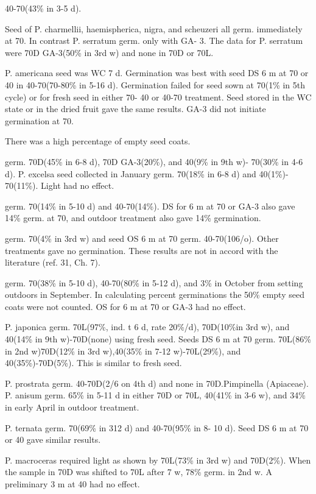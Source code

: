 \begin{description}
40-70(43\% in 3-5 d).
\item[Phyteuma (Campanulaceae)] Seed of P. charmellii, haemispherica, nigra,
and scheuzeri all germ. immediately at 70. In contrast P. serratum germ. only with GA-
3. The data for P. serratum were 70D GA-3(50\% in 3rd w) and none in 70D or 70L.
\item[Phytolacca (Phytolaccaceae)] P. americana seed was WC 7 d.
Germination was best with seed DS 6 m at 70 or 40 in 40-70(70-80\% in 5-16 d).
Germination failed for seed sown at 70(1\% in 5th cycle) or for fresh seed in either 70-
40 or 40-70 treatment. Seed stored in the WC state or in the dried fruit gave the same
results. GA-3 did not initiate germination at 70.

\item[Picea (Pinaceae)] There was a high percentage of empty seed coats.
\item[P. abies] germ. 70D(45\% in 6-8 d), 70D GA-3(20\%), and 40(9\% in 9th w)-
70(30\% in 4-6 d).
P. excelsa seed collected in January germ. 70(18\% in 6-8 d) and 40(1\%)-
70(11\%). Light had no effect.
\item[P. mariana] germ. 70(14\% in 5-10 d) and 40-70(14\%). DS for 6 m at 70 or GA-3
also gave 14\% germ. at 70, and outdoor treatment also gave 14\% germination.
\item[P. pungens] germ. 70(4\% in 3rd w) and seed OS 6 m at 70 germ. 40-70(106/o).
Other treatments gave no germination. These results are not in accord with the
literature (ref. 31, Ch. 7).
\item[P. rubra] germ. 70(38\% in 5-10 d), 40-70(80\% in 5-12 d), and 3\% in October
from setting outdoors in September. In calculating percent germinations the 50\%
empty seed coats were not counted. OS for 6 m at 70 or GA-3 had no effect.

\item[Pieris (Ericaceae)] P. japonica germ. 70L(97\%, ind. t 6 d, rate 20\%/d),
70D(10\%in 3rd w), and 40(14\% in 9th w)-70D(none) using fresh seed. Seeds DS 6 m
at 70 germ. 70L(86\% in 2nd w)70D(12\% in 3rd w),40(35\% in 7-12 w)-70L(29\%), and
40(35\%)-70D(5\%). This is similar to fresh seed.
\item[Pimelea (Thymelaceae)] P. prostrata germ. 40-70D(2/6 on 4th d) and none
in 70D.Pimpinella (Apiaceae). P. anisum germ. 65\% in 5-11 d in either 70D or
70L, 40(41\% in 3-6 w), and 34\% in early April in outdoor treatment.
\item[Pinellia (Araceae)] P. ternata germ. 70(69\% in 312 d) and 40-70(95\% in 8-
10 d). Seed DS 6 m at 70 or 40 gave similar results.
\item[Pinguicula (Lent lbulariaceae)] P. macroceras required light as shown by
70L(73\% in 3rd w) and 70D(2\%). When the sample in 70D was shifted to 70L after 7
w, 78\% germ. in 2nd w. A preliminary 3 m at 40 had no effect.


\end{description}
